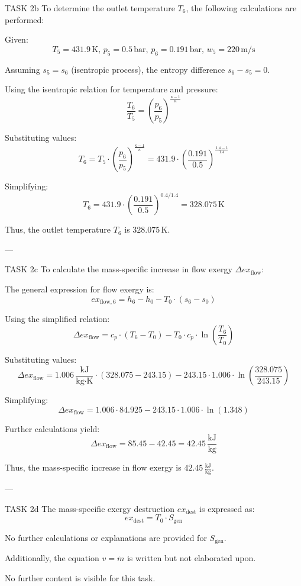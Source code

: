 TASK 2b  
To determine the outlet temperature \( T_6 \), the following calculations are performed:  

Given:  
\[
T_5 = 431.9 \, \text{K}, \, p_5 = 0.5 \, \text{bar}, \, p_6 = 0.191 \, \text{bar}, \, w_5 = 220 \, \text{m/s}
\]  

Assuming \( s_5 = s_6 \) (isentropic process), the entropy difference \( s_6 - s_5 = 0 \).  

Using the isentropic relation for temperature and pressure:  
\[
\frac{T_6}{T_5} = \left( \frac{p_6}{p_5} \right)^{\frac{\kappa - 1}{\kappa}}
\]  

Substituting values:  
\[
T_6 = T_5 \cdot \left( \frac{p_6}{p_5} \right)^{\frac{\kappa - 1}{\kappa}} = 431.9 \cdot \left( \frac{0.191}{0.5} \right)^{\frac{1.4 - 1}{1.4}}
\]  

Simplifying:  
\[
T_6 = 431.9 \cdot \left( \frac{0.191}{0.5} \right)^{0.4 / 1.4} = 328.075 \, \text{K}
\]  

Thus, the outlet temperature \( T_6 \) is \( 328.075 \, \text{K} \).  

---

TASK 2c  
To calculate the mass-specific increase in flow exergy \( \Delta ex_{\text{flow}} \):  

The general expression for flow exergy is:  
\[
ex_{\text{flow},6} = h_6 - h_0 - T_0 \cdot (s_6 - s_0)
\]  

Using the simplified relation:  
\[
\Delta ex_{\text{flow}} = c_p \cdot (T_6 - T_0) - T_0 \cdot c_p \cdot \ln \left( \frac{T_6}{T_0} \right)
\]  

Substituting values:  
\[
\Delta ex_{\text{flow}} = 1.006 \, \frac{\text{kJ}}{\text{kg·K}} \cdot (328.075 - 243.15) - 243.15 \cdot 1.006 \cdot \ln \left( \frac{328.075}{243.15} \right)
\]  

Simplifying:  
\[
\Delta ex_{\text{flow}} = 1.006 \cdot 84.925 - 243.15 \cdot 1.006 \cdot \ln \left( 1.348 \right)
\]  

Further calculations yield:  
\[
\Delta ex_{\text{flow}} = 85.45 - 42.45 = 42.45 \, \frac{\text{kJ}}{\text{kg}}
\]  

Thus, the mass-specific increase in flow exergy is \( 42.45 \, \frac{\text{kJ}}{\text{kg}} \).  

---

TASK 2d  
The mass-specific exergy destruction \( ex_{\text{dest}} \) is expressed as:  
\[
ex_{\text{dest}} = T_0 \cdot S_{\text{gen}}
\]  

No further calculations or explanations are provided for \( S_{\text{gen}} \).  

Additionally, the equation \( v = \dot{m} \) is written but not elaborated upon.  

No further content is visible for this task.